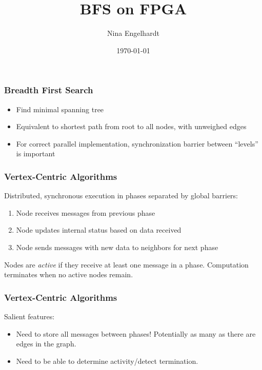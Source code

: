 \documentclass[14pt]{beamer}
\title{BFS on FPGA}
\author{Nina Engelhardt}
\date{\today}
\begin{document}
	\begin{frame}
		\maketitle
	\end{frame}
\setlength{\parskip}{1em}


\begin{frame}
	\frametitle{Breadth First Search}

	\begin{itemize}
		\addtolength{\itemsep}{0.5\baselineskip}
		\item Find minimal spanning tree
		\item Equivalent to shortest path from root to all nodes, with unweighed edges
		\item For correct parallel implementation, synchronization barrier between ``levels'' is important
	\end{itemize}
\end{frame}

\begin{frame}
	\frametitle{Vertex-Centric Algorithms}
	Distributed, synchronous execution in phases separated by global barriers:
	\vspace{-0.5em}
	\begin{enumerate}
		\item Node receives messages from previous phase
		\item Node updates internal status based on data received
		\item Node sends messages with new data to neighbors for next phase
	\end{enumerate}
	\vspace{-0.5em}
	Nodes are \emph{active} if they receive at least one message in a phase.
	Computation terminates when no active nodes remain.
\end{frame}

\begin{frame}
	\frametitle{Vertex-Centric Algorithms}
	Salient features:
	\vspace{-0.8em}
	\begin{itemize}
		\addtolength{\itemsep}{0.5\baselineskip}
		\item Need to store all messages between phases! Potentially as many as there are edges in the graph.
		\item Need to be able to determine activity/detect termination.
	\end{itemize}
\end{frame}
\end{document}
